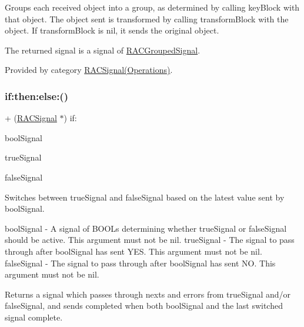 Groups each received object into a group, as determined by calling {\ttfamily key\+Block} with that object. The object sent is transformed by calling {\ttfamily transform\+Block} with the object. If {\ttfamily transform\+Block} is nil, it sends the original object.

The returned signal is a signal of \mbox{\hyperlink{interface_r_a_c_grouped_signal}{R\+A\+C\+Grouped\+Signal}}. 

Provided by category \mbox{\hyperlink{category_r_a_c_signal_07_operations_08_ad04cf174e24905df96f211b60e31a3cd}{R\+A\+C\+Signal(\+Operations)}}.

\mbox{\label{interface_r_a_c_signal_a67c14dfcf505999bc53632e336f6cb84}} 
\subsubsection{\texorpdfstring{if\+:then\+:else\+:()}{if:then:else:()}\hspace{0.1cm}{\footnotesize\ttfamily [1/3]}}
{\footnotesize\ttfamily + (\mbox{\hyperlink{interface_r_a_c_signal}{R\+A\+C\+Signal}} $\ast$) if\+: \begin{DoxyParamCaption}\item[{(\mbox{\hyperlink{interface_r_a_c_signal}{R\+A\+C\+Signal}} $\ast$)}]{bool\+Signal }\item[{then:(\mbox{\hyperlink{interface_r_a_c_signal}{R\+A\+C\+Signal}} $\ast$)}]{true\+Signal }\item[{else:(\mbox{\hyperlink{interface_r_a_c_signal}{R\+A\+C\+Signal}} $\ast$)}]{false\+Signal }\end{DoxyParamCaption}}

Switches between {\ttfamily true\+Signal} and {\ttfamily false\+Signal} based on the latest value sent by {\ttfamily bool\+Signal}.

bool\+Signal -\/ A signal of B\+O\+O\+Ls determining whether {\ttfamily true\+Signal} or {\ttfamily false\+Signal} should be active. This argument must not be nil. true\+Signal -\/ The signal to pass through after {\ttfamily bool\+Signal} has sent Y\+ES. This argument must not be nil. false\+Signal -\/ The signal to pass through after {\ttfamily bool\+Signal} has sent NO. This argument must not be nil.

Returns a signal which passes through {\ttfamily next}s and {\ttfamily error}s from {\ttfamily true\+Signal} and/or {\ttfamily false\+Signal}, and sends {\ttfamily completed} when both {\ttfamily bool\+Signal} and the last switched signal complete. 

